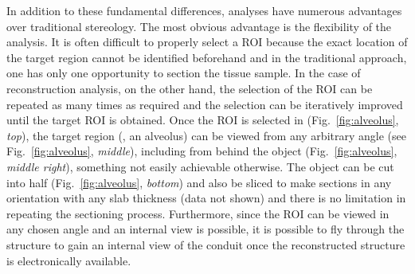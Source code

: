 In addition to these fundamental differences, \threed analyses have numerous advantages over traditional stereology. The most obvious advantage is the flexibility of the analysis. It is often difficult to properly select a \ac{ROI} because the exact location of the target region cannot be identified beforehand and in the traditional approach, one has only one opportunity to section the tissue sample. In the case of \threed reconstruction analysis, on the other hand, the selection of the \ac{ROI} can be repeated as many times as required and the selection can be iteratively improved until the target \ac{ROI} is obtained. Once the \ac{ROI} is selected in \threed (Fig.~\ref{fig:alveolus}, \textit{top}), the target region (\eg, an alveolus) can be viewed from any arbitrary angle (see Fig.~\ref{fig:alveolus}, \textit{middle}), including from behind the object (Fig.~\ref{fig:alveolus}, \textit{middle right}), something not easily achievable otherwise. The \threed object can be cut into half (Fig.~\ref{fig:alveolus}, \textit{bottom}) and also be sliced to make \twod sections in any orientation with any slab thickness (data not shown) and there is no limitation in repeating the sectioning process. Furthermore, since the \ac{ROI} can be viewed in any chosen angle and an internal view is possible, it is possible to fly through the structure to gain an internal view of the conduit once the \threed reconstructed structure is electronically available.

